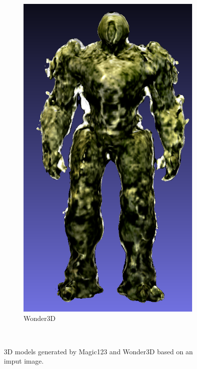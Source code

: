 \begin{figure}[H]
\begin{subfigure}[b]{0.21\textwidth}
        \includegraphics[width=\textwidth]{etc/a robot made out of plants/wonder3d/wonder3d_plantrobot_model_resized}
        \caption{Wonder3D}
    \end{subfigure}
    \caption{3D models generated by Magic123 and Wonder3D based on an imput image.}~\label{fig:inputAndModel}
  \end{figure}